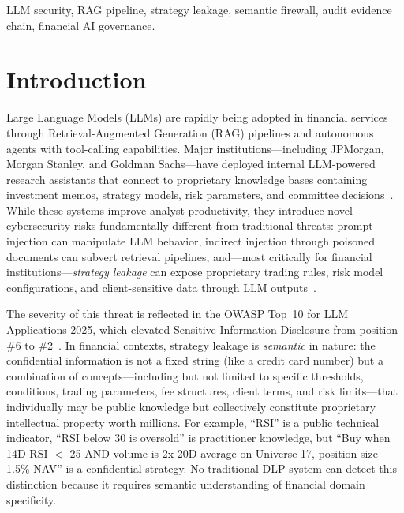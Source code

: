 \documentclass[journal,12pt,onecolumn,draftclsnofoot]{IEEEtran}
\begin{document}
\begin{IEEEkeywords}
LLM security, RAG pipeline, strategy leakage, semantic firewall, audit evidence chain, financial AI governance.
\end{IEEEkeywords}

\IEEEpeerreviewmaketitle

\section{Introduction}
\label{Sect:Introduction}

Large Language Models (LLMs) are rapidly being adopted in financial services through Retrieval-Augmented Generation (RAG) pipelines and autonomous agents with tool-calling capabilities. Major institutions---including JPMorgan, Morgan Stanley, and Goldman Sachs---have deployed internal LLM-powered research assistants that connect to proprietary knowledge bases containing investment memos, strategy models, risk parameters, and committee decisions~\cite{wsj_jpmorgan_ai, bloomberg_ms_ai, ft_gs_ai}. While these systems improve analyst productivity, they introduce novel cybersecurity risks fundamentally different from traditional threats: prompt injection can manipulate LLM behavior, indirect injection through poisoned documents can subvert retrieval pipelines, and---most critically for financial institutions---\textit{strategy leakage} can expose proprietary trading rules, risk model configurations, and client-sensitive data through LLM outputs~\cite{owasp_llm_2025}.

The severity of this threat is reflected in the OWASP Top~10 for LLM Applications 2025, which elevated Sensitive Information Disclosure from position \#6 to \#2~\cite{owasp_llm_2025}. In financial contexts, strategy leakage is \textit{semantic} in nature: the confidential information is not a fixed string (like a credit card number) but a combination of concepts---including but not limited to specific thresholds, conditions, trading parameters, fee structures, client terms, and risk limits---that individually may be public knowledge but collectively constitute proprietary intellectual property worth millions. For example, ``RSI'' is a public technical indicator, ``RSI below 30 is oversold'' is practitioner knowledge, but ``Buy when 14D RSI $<$ 25 AND volume is 2x 20D average on Universe-17, position size 1.5\% NAV'' is a confidential strategy. No traditional DLP system can detect this distinction because it requires semantic understanding of financial domain specificity.
\end{document}
